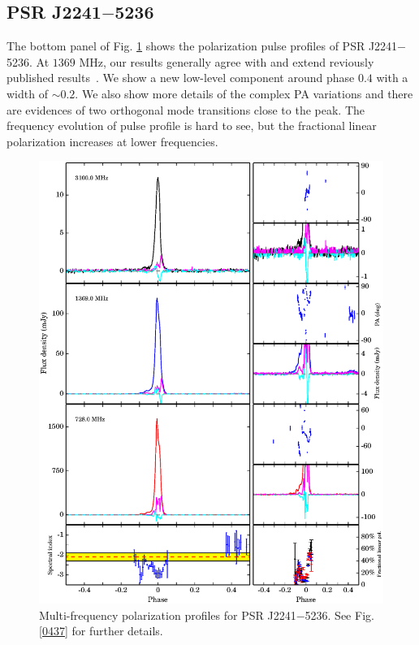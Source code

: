 \documentclass[useAMS,usenatbib]{mn2e}
\begin{document}

\subsection{PSR J2241$-$5236}

The bottom panel of Fig. \ref{2241} shows the polarization pulse profiles of 
PSR J2241$-$5236.
%
At $1369$ MHz, our results generally agree with and extend reviously published 
results~\citep{Keith11}.
%
We show a new low-level component around phase $0.4$ with a width of $\sim 0.2$.
%
We also show more details of the complex PA variations and there are evidences 
of two orthogonal mode transitions close to the peak.
%
The frequency evolution of pulse profile is hard to see, but the fractional 
linear polarization increases at lower frequencies.

\begin{figure}
\begin{center}
\includegraphics[width=6 in]{2241.ps}
\caption{Multi-frequency polarization profiles for PSR J2241$-$5236. 
See Fig. \ref{0437} for further details.}
\label{2241}
\end{center}
\end{figure}
\end{document}
